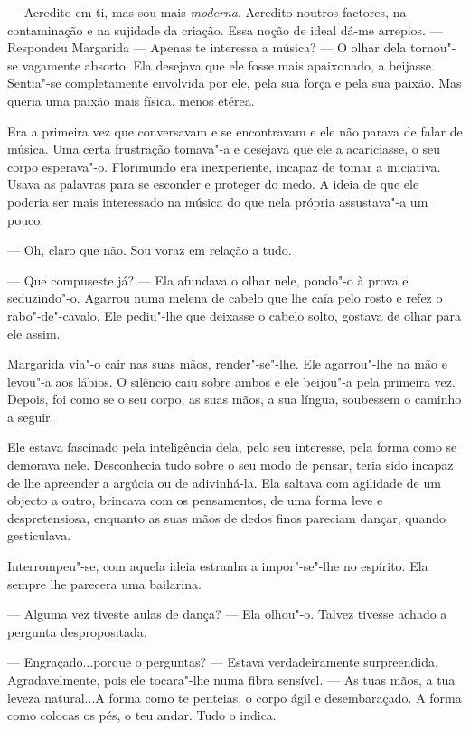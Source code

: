 --- Acredito em ti, mas sou mais \emph{moderna}. Acredito noutros factores, na
contaminação e na sujidade da criação. Essa noção de ideal dá-me
arrepios. --- Respondeu Margarida --- Apenas te interessa a música? --- O
olhar dela tornou"-se vagamente absorto. Ela desejava que ele fosse mais
apaixonado, a beijasse. Sentia"-se completamente envolvida por ele, pela
sua força e pela sua paixão. Mas queria uma paixão mais física, menos
etérea.

Era a primeira vez que conversavam e se encontravam e ele não parava de
falar de música. Uma certa frustração tomava"-a e desejava que ele a
acariciasse, o seu corpo esperava"-o. Florimundo era inexperiente,
incapaz de tomar a iniciativa. Usava as palavras para se esconder e
proteger do medo. A ideia de que ele poderia ser mais interessado na
música do que nela própria assustava"-a um pouco.

--- Oh, claro que não. Sou voraz em relação a tudo.

--- Que compuseste já? --- Ela afundava o olhar nele, pondo"-o à prova e
seduzindo"-o. Agarrou numa melena de cabelo que lhe caía pelo rosto e
refez o rabo"-de"-cavalo. Ele pediu"-lhe que deixasse o cabelo solto,
gostava de olhar para ele assim.

Margarida via"-o cair nas suas mãos, render"-se"-lhe. Ele agarrou"-lhe na
mão e levou"-a aos lábios. O silêncio caiu sobre ambos e ele beijou"-a
pela primeira vez. Depois, foi como se o seu corpo, as suas mãos, a sua
língua, soubessem o caminho a seguir.

Ele estava fascinado pela inteligência dela, pelo seu interesse, pela
forma como se demorava nele. Desconhecia tudo sobre o seu modo de
pensar, teria sido incapaz de lhe apreender a argúcia ou de adivinhá-la.
Ela saltava com agilidade de um objecto a outro, brincava com os
pensamentos, de uma forma leve e despretensiosa, enquanto as suas mãos
de dedos finos pareciam dançar, quando gesticulava.

Interrompeu"-se, com aquela ideia estranha a impor"-se"-lhe no espírito.
Ela sempre lhe parecera uma bailarina.

--- Alguma vez tiveste aulas de dança? --- Ela olhou"-o. Talvez tivesse
achado a pergunta despropositada.

--- Engraçado...porque o perguntas? --- Estava verdadeiramente surpreendida.
Agradavelmente, pois ele tocara"-lhe numa fibra sensível. --- As tuas mãos,
a tua leveza natural...A forma como te penteias, o corpo ágil e
desembaraçado. A forma como colocas os pés, o teu andar. Tudo o indica.

